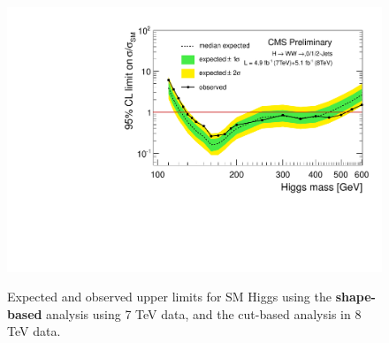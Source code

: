 
\begin{figure}[!hbtp]
\centering
\label{subfig:sm_ichep2012_comb}
\includegraphics[width=.45\textwidth]{figures/limits_nj_shape7TeV_cut8TeV-CLs-asymptotic_log.pdf}
\label{fig:uls_cut_finalcomb}
\caption{Expected and observed upper limits for SM Higgs using the
  {\bf shape-based} analysis using 7 TeV data, and the cut-based analysis in 8 TeV data. }
\end{figure}

